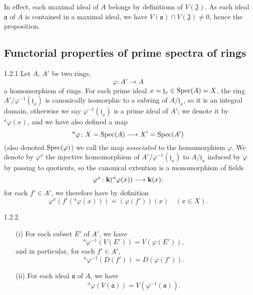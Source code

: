 \documentclass{book}
\begin{document}
In effect, each maximal ideal of $A$ belongs by definitionn of $V(\mathfrak{J})$.
As each ideal $\mathfrak{a}$ of $A$ is contained in a maximal ideal, we have
$V(\mathfrak{a})\cap V(\mathfrak{J})\neq 0$, hence the proposition.

\subsection{Functorial properties of prime spectra of rings}
\label{1-schemes-1.2}       

\begin{env}{1.2.1}
\label{env-1.1.2.1}
Let $A$, $A'$ be two rings,
\[
  \varphi\colon A'\longrightarrow A
\]
a homomorphism of rings. For each prime ideal $x=\mathfrak{j}_x\in{\mathop{\mathrm{Spec}}\nolimits}(A)=X$, the
ring $A'/\varphi^{-1}(\mathfrak{j}_x)$ is canonically isomorphic to a subring of
$A/\mathfrak{j}_x$, so it is an integral domain, otherwise we say
$\varphi^{-1}(\mathfrak{j}_x)$ is a prime ideal of $A'$; we denote it by
$^a\varphi(x)$, and we have also defined a map
\[
  ^a\varphi\colon X={\mathop{\mathrm{Spec}}\nolimits}(A)\longrightarrow X'={\mathop{\mathrm{Spec}}\nolimits}(A')
\]
(also denoted ${\mathop{\mathrm{Spec}}\nolimits}(\varphi)$) we call the map \emph{associated} to the
homomorphism $\varphi$. We denote by $\varphi^x$ the injective homomorphism of
$A'/\varphi^{-1}(\mathfrak{j}_x)$ to $A/\mathfrak{j}_x$ induced by $\varphi$ by
passing to quotients, so the canonical extention is a monomorphism of fields
\[
  \varphi^x\colon\mathbf{k}(^a\varphi(x))\longrightarrow\mathbf{k}(x);
\]
for each $f'\in A'$, we therefore have by definition
\[
  \varphi^x(f'(^a\varphi(x)))=(\varphi(f'))(x)\quad(x\in X).\tag{1.2.1.1}
\]
\end{env}

\begin{envs}[Proposition]{1.2.2}
\label{prop-1.1.2.2}
\medskip\noindent
\begin{itemize}
  \item[(i)] For each subset $E'$ of $A'$, we have
             \[
               ^a\varphi^{-1}(V(E'))=V(\varphi(E')),\tag{1.2.2.1}
             \]
             and in particular, for each $f'\in A'$,
             \[
               ^a\varphi^{-1}(D(f'))=D(\varphi(f')).\tag{1.2.2.2}
             \]
  \item[(ii)] For each ideal $\mathfrak{a}$ of $A$, we have
              \[
                \overline{^a\varphi(V(\mathfrak{a}))}=V(\varphi^{-1}(\mathfrak{a})).
                \tag{1.2.2.3}
              \]
\end{itemize}
\end{envs}
\end{document}
